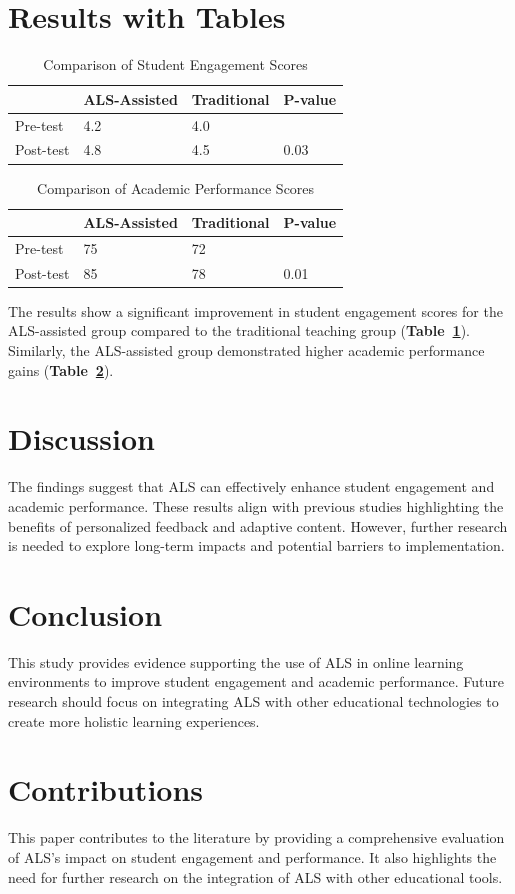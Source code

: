 \documentclass{article}
\begin{document}
\section{Results with Tables}
\begin{table}[htbp]
    \centering
    \caption{Comparison of Student Engagement Scores}
    \label{tab:engagement}
    \begin{tabular}{@{}llll@{}}
    \toprule
    & ALS-Assisted & Traditional & P-value \\
    \midrule
    Pre-test & 4.2 & 4.0 & \\
    Post-test & 4.8 & 4.5 & 0.03 \\
    \bottomrule
    \end{tabular}
\end{table}

\begin{table}[htbp]
    \centering
    \caption{Comparison of Academic Performance Scores}
    \label{tab:performance}
    \begin{tabular}{@{}llll@{}}
    \toprule
    & ALS-Assisted & Traditional & P-value \\
    \midrule
    Pre-test & 75 & 72 & \\
    Post-test & 85 & 78 & 0.01 \\
    \bottomrule
    \end{tabular}
\end{table}

The results show a significant improvement in student engagement scores for the ALS-assisted group compared to the traditional teaching group (\textbf{Table~\ref{tab:engagement}}). Similarly, the ALS-assisted group demonstrated higher academic performance gains (\textbf{Table~\ref{tab:performance}}).

\section{Discussion}
The findings suggest that ALS can effectively enhance student engagement and academic performance. These results align with previous studies highlighting the benefits of personalized feedback and adaptive content. However, further research is needed to explore long-term impacts and potential barriers to implementation.

\section{Conclusion}
This study provides evidence supporting the use of ALS in online learning environments to improve student engagement and academic performance. Future research should focus on integrating ALS with other educational technologies to create more holistic learning experiences.

\section{Contributions}
This paper contributes to the literature by providing a comprehensive evaluation of ALS's impact on student engagement and performance. It also highlights the need for further research on the integration of ALS with other educational tools.
\end{document}
